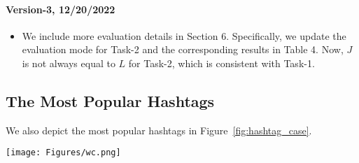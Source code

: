 \documentclass[11pt]{article}
\newcommand{\DataName}{MMDialog}
\begin{document}
\paragraph{Version-3, 12/20/2022}
\par

\begin{itemize}
\setlength{\itemsep}{0pt}
    \item We include more evaluation details in Section 6. Specifically, we update the evaluation mode for Task-2 and the corresponding results in Table 4. Now, $J$ is not always equal to $L$ for Task-2, which is consistent with Task-1.

\end{itemize}


\subsection{The Most Popular Hashtags}\label{appendix:dataset}

We also depict the most popular hashtags in Figure~\ref{fig:hashtag_case}.

\begin{figure*}[!tb]
\centering  \texttt{[image: Figures/wc.png]}
     \caption{200 most popular hashtags in \DataName~weighted by their frequencies.}
     \label{fig:hashtag_case}
\end{figure*}










 
\end{document}
